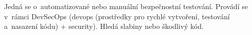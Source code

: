 Jedná se o~automatizované nebo manuální bezpečnostní testování. Provádí se v~rámci DevSecOps (devops (prostředky pro rychlé vytvoření, testování a~nasazení kódu) + security). Hledá slabiny nebo škodlivý kód.












